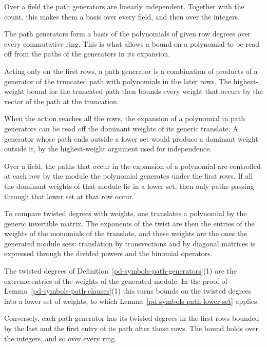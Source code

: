 Over a field the path generators are linearly independent. Together with the count, this makes them a
basis over every field, and then over the integers.

The path generators form a basis of the polynomials of given row degrees over every commutative ring.
This is what allows a bound on a polynomial to be read off from the paths of the generators in its
expansion.

Acting only on the first rows, a path generator is a combination of products of a generator of the
truncated path with polynomials in the later rows. The highest-weight bound for the truncated path then
bounds every weight that occurs by the vector of the path at the truncation.

When the action reaches all the rows, the expansion of a polynomial in path generators can be read off
the dominant weights of its generic translate. A generator whose path ends outside a lower set would
produce a dominant weight outside it, by the highest-weight argument used for independence.

Over a field, the paths that occur in the expansion of a polynomial are controlled at each row by the
module the polynomial generates under the first rows. If all the dominant weights of that module lie in
a lower set, then only paths passing through that lower set at that row occur.

To compare twisted degrees with weights, one translates a polynomial by the generic invertible matrix.
The exponents of the twist are then the entries of the weights of the monomials of the translate, and
these weights are the ones the generated module sees: translation by transvections and by
diagonal matrices is expressed through the divided powers and the binomial operators.

The twisted degrees of Definition~\ref{pd-symbols-path-generators}(1) are the extreme entries of the
weights of the generated module. In the proof of Lemma~\ref{pd-symbols-path-clauses}(1) this turns
bounds on the twisted degrees into a lower set of weights, to which Lemma~\ref{pd-symbols-path-lower-set}
applies.

Conversely, each path generator has its twisted degrees in the first rows bounded by the last and the
first entry of its path after those rows. The bound holds over the integers, and so over every ring.

